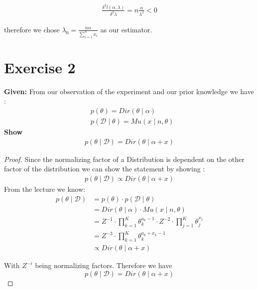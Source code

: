 \documentclass{article}
\begin{document}
\begin{align*}
    \frac{\delta^2 l(\alpha, \lambda)}{\delta^2 \lambda} = n \frac{\alpha}{\lambda^2}<0
\end{align*}

therefore we chose $\lambda_0 = \frac{n \alpha}{\sum_{i=1}^n x_i}$ as our estimator.
\section*{Exercise 2}
\textbf{Given:} From our observation of the experiment and our prior knowledge we have :
\begin{align*}
    &p(\theta) = Dir(\theta \mid \alpha) \\
    &p( \mathcal{D} \mid \theta) = Mu(x \mid n,\theta)
\end{align*}
\textbf{Show} 
\begin{align*}
    p(\theta \mid \mathcal{D}) = Dir(\theta \mid \alpha+x)
\end{align*}

\begin{proof}
    Since the normalizing factor of a Distribution is dependent on the other factor of the distribution we can show the statement by showing :
    \begin{align*}
        p(\theta \mid \mathcal{D}) 	\propto Dir(\theta \mid \alpha + x)
    \end{align*}
From the lecture we know:
\begin{align*}
    p(\theta \mid \mathcal{D})  &= p(\theta) \cdot p( \mathcal{D} \mid \theta) \\
                                &= Dir(\theta \mid \alpha) \cdot Mu(x \mid n,\theta) \\
                                &= Z^{-1} \cdot \prod_{k=1}^K \theta_k^{a_k-1} \cdot Z^{-2} \cdot \prod_{j=1}^K \theta_j^{x_j}\\
                                &= Z^{-3}  \cdot \prod_{k=1}^K \theta_k^{a_k + x_k-1}\\
                                &\propto Dir(\theta \mid \alpha + x)
\end{align*}

With $Z^{-i}$  being normalizing factors. Therefore we have    
\[
     p(\theta \mid \mathcal{D}) = Dir(\theta \mid \alpha+x)
    \]
\end{proof}
\end{document}

